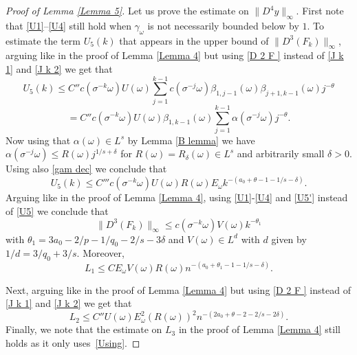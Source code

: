\documentclass[11pt,reqno,a4paper]{article}
\theoremstyle{special}
\def\om{\omega}
\begin{document}
\begin{proof}[Proof of Lemma \ref{Lemma 5}]
Let us prove the estimate on $\|D^4y\|_\infty$. First note that \eqref{U1}--\eqref{U4} still hold when $\gamma_\om$ is not necessarily bounded below by $1$.
To estimate the term $U_5(k)$ that appears in the upper bound of $\|D^3(F_k)\|_\infty$, arguing like in the proof of Lemma \ref{Lemma 4} but using \eqref{D 2 F } instead of \eqref{J k 1} and \eqref{J k 2} we get that 
$$
U_5(k)\leq C''c(\sigma^{-k}\om)U(\om)\sum_{j=1}^{k-1}c(\sigma^{-j}\om)\beta_{1,j-1}(\om)\beta_{j+1,k-1}(\om)j^{-\theta}
$$
$$
=C''c(\sigma^{-k}\om)U(\om)\beta_{1,k-1}(\om)\sum_{j=1}^{k-1}\alpha(\sigma^{-j}\om)j^{-\theta}.
$$
Now using that $\alpha(\om)\in L^s$ by Lemma \ref{B lemma} we have $\alpha(\sigma^{-j}\om)\leq R(\om)j^{1/s+\delta}$ for $R(\om)=R_\delta(\om)\in L^s$ and arbitrarily small $\delta>0$. Using also \eqref{gam dec} we  conclude that 
\begin{equation}\label{U5'}
U_5(k)\leq C'''c(\sigma^{-k}\om)U(\om)R(\om)E_\om k^{-(a_0+\theta-1-1/s-\delta)}.    
\end{equation}
Arguing like in the proof of Lemma \ref{Lemma 4}, using \eqref{U1}-\eqref{U4} and \eqref{U5'} instead of \eqref{U5} we conclude that
$$
\|D^3(F_k)\|_\infty\leq c(\sigma^{-k}\om)V(\om)k^{-\theta_1}
$$
with $\theta_1=3a_0-2/p-1/q_0-2/s-3\delta$ and $V(\om)\in L^{d}$ with $d$ given by $1/d=3/q_0+3/s$. Moreover,
$$
L_1\leq CE_\om V(\om)R(\om)n^{-(a_0+\theta_1-1-1/s-\delta)}.
$$

Next, arguing like in the proof of Lemma \ref{Lemma 4} but using \eqref{D 2 F } instead of \eqref{J k 1} and \eqref{J k 2} we get that 
$$
L_2\leq C''U(\om)E_\om^2 (R(\om))^2 n^{-(2a_0+\theta-2-2/s-2\delta)}.
$$
Finally, we note that 
the estimate on $L_3$ in the proof of Lemma \ref{Lemma 4} still holds as it only uses~\eqref{Using}.
\end{proof}
\end{document}
